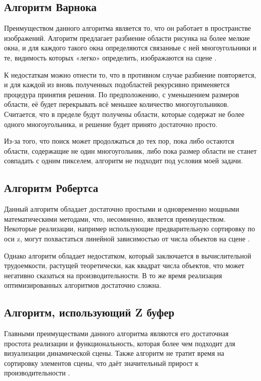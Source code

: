 \subsection{Алгоритм Варнока}

Преимуществом данного алгоритма является то, что он работает в пространстве изображений. Алгоритм предлагает разбиение области рисунка на более мелкие окна, и для каждого такого окна определяются связанные с ней многоугольники и те, видимость которых «легко» определить, изображаются на сцене \cite{varnok}.

К недостаткам можно отнести то, что в противном случае разбиение повторяется, и для каждой из вновь полученных подобластей рекурсивно применяется процедура принятия решения. По предположению, с уменьшением размеров области, её будет перекрывать всё меньшее количество многоугольников. Считается, что в пределе будут получены области, которые содержат не более одного многоугольника, и решение будет принято достаточно просто.

Из-за того, что поиск может продолжаться до тех пор, пока либо остаются области, содержащие не один многоугольник, либо пока размер области не станет совпадать с одним пикселем, алгоритм не подходит под условия моей задачи.

\subsection{Алгоритм Робертса}

Данный алгоритм обладает достаточно простыми и одновременно мощными математическими методами, что, несомненно, является преимуществом. Некоторые реализации, например использующие предварительную сортировку по оси z, могут похвастаться линейной зависимостью от числа объектов на сцене \cite{roberts}.

Однако алгоритм обладает недостатком, который заключается в вычислительной трудоемкости, растущей теоретически, как квадрат числа объектов, что может негативно сказаться на производительности. В то же время реализация оптимизированных алгоритмов достаточно сложна.

\subsection{Алгоритм, использующий Z буфер}

Главными преимуществами данного алгоритма являются его достаточная простота реализации и функциональность, которая более чем подходит для визуализации динамической сцены. Также алгоритм не тратит время на сортировку элементов сцены, что даёт значительный прирост к производительности \cite{zbufer}.

